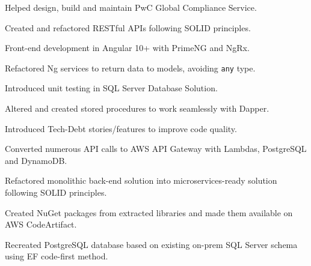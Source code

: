\documentclass[letterpaper]{cv_12} %
\begin{document}
\begin{minipage}[t]{0.59\textwidth}
    \begin{tightitemize}
        \item Helped design, build and maintain PwC Global Compliance Service.
        \item Created and refactored RESTful APIs following SOLID
        principles.
        \item Front-end development in Angular 10+ with PrimeNG and
        NgRx.
        \item Refactored Ng services to return data to models, avoiding
        \verb|any| type.
        \item Introduced unit testing in SQL Server Database Solution.
        \item Altered and created stored procedures to work seamlessly
        with Dapper.
        \item Introduced Tech-Debt stories/features to improve code
        quality.
    \end{tightitemize}

    \sectionspace%


    \begin{tightitemize}
        \item Converted numerous API calls to AWS API Gateway with
        Lambdas, PostgreSQL and DynamoDB.\@
        \item Refactored monolithic back-end solution into
        microservices-ready solution following SOLID principles.\@
        \item Created NuGet packages from extracted libraries and made
        them available on AWS CodeArtifact.
        \item Recreated PostgreSQL database based on existing on-prem
        SQL Server schema using EF code-first method.
    \end{tightitemize}

    \sectionspace%



\end{minipage}
\end{document}
